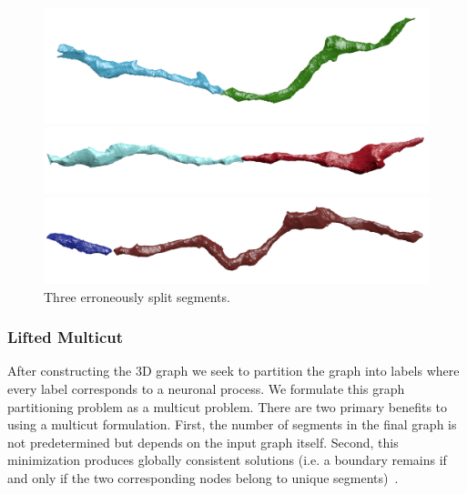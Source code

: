\begin{figure}[t]
	\centering
	\begin{minipage}{0.32\linewidth}
		\includegraphics[width=\linewidth]{./figures/split_error1.png}		
	\end{minipage}
	\hfill
	\begin{minipage}{0.32\linewidth}
		\includegraphics[width=\linewidth]{./figures/split_error2.png}				
	\end{minipage}
	\hfill
	\begin{minipage}{0.32\linewidth}
		\includegraphics[width=\linewidth]{./figures/split_error3.png}
	\end{minipage}
	\caption{Three erroneously split segments.}
	\label{fig:merge_candidates}
\end{figure}
\subsubsection{Lifted Multicut}

After constructing the 3D graph we seek to partition the graph into labels where every label corresponds to a neuronal process. 
We formulate this graph partitioning problem as a multicut problem.
There are two primary benefits to using a multicut formulation. 
First, the number of segments in the final graph is not predetermined but depends on the input graph itself. 
Second, this minimization produces globally consistent solutions (i.e. a boundary remains if and only if the two corresponding nodes belong to unique segments)~\cite{keuper2015efficient}.

